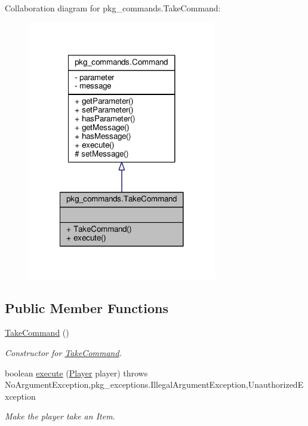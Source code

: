 Collaboration diagram for pkg\-\_\-commands.\-Take\-Command\-:\nopagebreak
\begin{figure}[H]
\begin{center}
\leavevmode
\includegraphics[width=234pt]{classpkg__commands_1_1TakeCommand__coll__graph}
\end{center}
\end{figure}
\subsection*{Public Member Functions}
\begin{DoxyCompactItemize}
\item 
\hyperlink{classpkg__commands_1_1TakeCommand_a1f6989e8d9dce087d5f70cf748c53119}{Take\-Command} ()
\begin{DoxyCompactList}\small\item\em Constructor for \hyperlink{classpkg__commands_1_1TakeCommand}{Take\-Command}. \end{DoxyCompactList}\item 
boolean \hyperlink{classpkg__commands_1_1TakeCommand_a17789062aaf2ab5747c7eeac118875cd}{execute} (\hyperlink{classpkg__world_1_1Player}{Player} player)  throws No\-Argument\-Exception,pkg\-\_\-exceptions.\-Illegal\-Argument\-Exception,\-Unauthorized\-Exception 
\begin{DoxyCompactList}\small\item\em Make the player take an Item. \end{DoxyCompactList}\end{DoxyCompactItemize}
